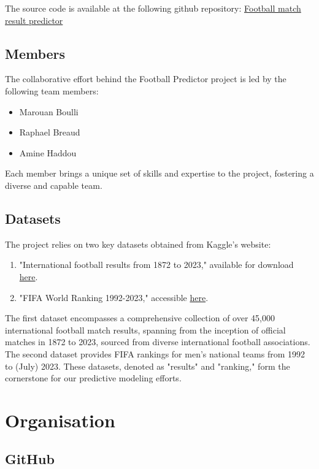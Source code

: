 \documentclass[a4paper,12pt]{article}
\begin{document}
The source code is available at the following github repository: \href{https://github.com/H4znow/Football_match_results_predictor}{Football match result predictor}

\subsection{Members}

The collaborative effort behind the Football Predictor project is led by the following team members:
\begin{itemize}
    \item Marouan Boulli
    \item Raphael Breaud
    \item Amine Haddou
\end{itemize}
Each member brings a unique set of skills and expertise to the project, fostering a diverse and capable team.

\subsection{Datasets} 

The project relies on two key datasets obtained from Kaggle's website:
\begin{enumerate}
    \item "International football results from 1872 to 2023," available for download \href{lien_vers_le_fichier_results}{here}.
    \item "FIFA World Ranking 1992-2023," accessible \href{lien_vers_le_fichier_ranking}{here}.
\end{enumerate}
The first dataset encompasses a comprehensive collection of over 45,000 international football match results, spanning from the inception of official matches in 1872 to 2023, sourced from diverse international football associations. The second dataset provides FIFA rankings for men's national teams from 1992 to (July) 2023. These datasets, denoted as "results" and "ranking," form the cornerstone for our predictive modeling efforts.

\section{Organisation}

\subsection{GitHub} 
\end{document}
